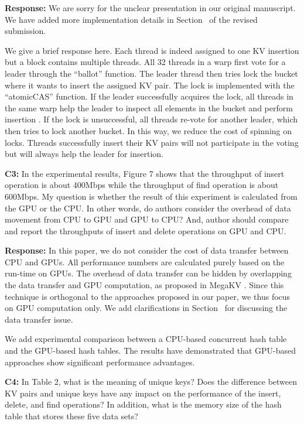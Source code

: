 \noindent\textbf{Response:} We are sorry for the unclear presentation in our original manuscript. We have added more implementation details in Section~ of the revised submission. 

We give a brief response here. Each thread is indeed assigned to one KV insertion but a block contains multiple threads. All 32 threads in a warp first vote for a leader through the ``ballot'' function.
The leader thread then tries lock the bucket where it wants to insert the assigned KV pair. The lock is implemented with the ``atomicCAS'' function. If the leader successfully acquires the lock, all threads in the same warp help the leader to inspect all elements in the bucket and perform insertion . If the lock is unsuccessful, all threads re-vote for another leader, which then tries to lock another bucket. In this way, we reduce the cost of spinning on locks. Threads successfully insert their KV pairs will not participate in the voting but will always help the leader for insertion. 
 

\begin{shaded}
	\noindent\textbf{C3:} In the experimental results, Figure 7 shows that the throughput of insert operation is about 400Mbps while the throughput of find operation is about 600Mbps. My question is whether the result of this experiment is calculated from the GPU or the CPU. In other words, do authors consider the overhead of data movement from CPU to GPU and GPU to CPU? And, author should compare and report the throughputs of insert and delete operations on GPU and CPU.
\end{shaded}

\noindent\textbf{Response:} 
In this paper, we do not consider the cost of data transfer between CPU and GPUs. All performance numbers are calculated purely based on the run-time on GPUs. 
The overhead of data transfer can be hidden by overlapping the data transfer and GPU computation, as proposed in MegaKV \cite{zhang2015mega}. Since this technique is orthogonal to the approaches proposed in our paper, we thus focus on GPU computation only. We add clarifications in Section~ for discussing the data transfer issue.

We add experimental comparison between a CPU-based concurrent hash table  and the GPU-based hash tables. The results have demonstrated that GPU-based approaches show significant performance advantages.  

\begin{shaded}
	\noindent\textbf{C4:} In Table 2, what is the meaning of unique keys? Does the difference between KV pairs and unique keys have any impact on the performance of the insert, delete, and find operations? In addition, what is the memory size of the hash table that stores these five data sets?
\end{shaded}

